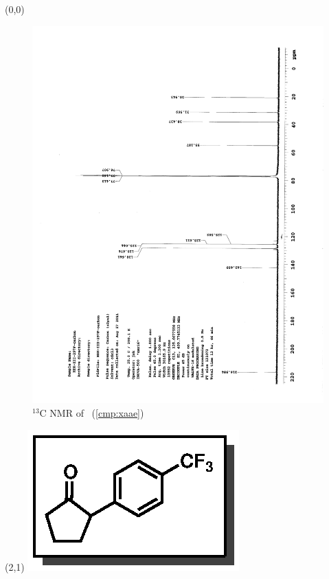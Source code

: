 \clearpage
\begin{textblock}{20}(0,0)
\begin{figure}[htb]
\caption{$^{13}$C NMR of  \CMPxaae\ (\ref{cmp:xaae})}
\includegraphics[scale=0.75, trim = 0mm 0mm 0mm 5mm,
clip]{chp_asymmetric/images/nmr/xaaeC}
\vspace{-100pt}
\end{figure}
\end{textblock}
\begin{textblock}{1}(2,1)
\includegraphics[scale=0.8, angle=90]{chp_asymmetric/images/xaae}
\end{textblock}
\clearpage


